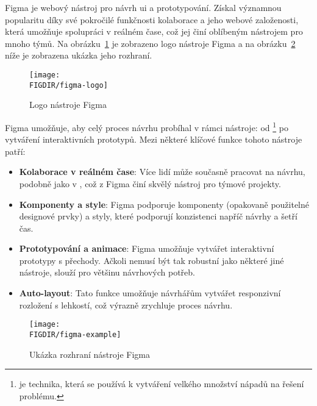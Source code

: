 \begin{subsection}{Figma}
    \label{subsec:navrh-ui-nastroje-figma}
     je webový nástroj pro návrh \ac{ui} a prototypování.
    Získal významnou popularitu díky své pokročilé funkčnosti kolaborace a jeho webové založenosti, která umožňuje spolupráci v reálném čase, což jej činí oblíbeným nástrojem pro mnoho týmů\cite{w_industry_the_ultimate_battle_figma_vs_sketch_vs_adobe_xd}.
    Na obrázku~\ref{fig:figma-logo} je zobrazeno logo nástroje Figma a na obrázku~\ref{fig:figma-example} níže je zobrazena ukázka jeho rozhraní.

    \begin{figure}[H]
        \centering
        \texttt{[image: \\FIGDIR/figma-logo]}
        \caption{Logo nástroje Figma\cite{figma}}
        \label{fig:figma-logo}
    \end{figure}

    Figma umožňuje, aby celý proces návrhu probíhal v rámci nástroje: od \footnote{ je technika, která se používá k vytváření velkého množství nápadů na řešení problému.} po vytváření interaktivních prototypů.
    Mezi některé klíčové funkce tohoto nástroje patří:

    \begin{itemize}
        \item \textbf{Kolaborace v reálném čase}: Více lidí může současně pracovat na návrhu, podobně jako v , což z Figma činí skvělý nástroj pro týmové projekty.
        \item \textbf{Komponenty a style}: Figma podporuje komponenty (opakovaně použitelné designové prvky) a styly, které podporují konzistenci napříč návrhy a šetří čas.
        \item \textbf{Prototypování a animace}: Figma umožňuje vytvářet interaktivní prototypy s přechody.
        Ačkoli nemusí být tak robustní jako některé jiné nástroje, slouží pro většinu návrhových potřeb.
        \item \textbf{Auto-layout}: Tato funkce umožňuje návrhářům vytvářet responzivní rozložení s lehkostí, což výrazně zrychluje proces návrhu.
    \end{itemize}

    \begin{figure}[H]
        \centering
        \texttt{[image: \\FIGDIR/figma-example]}
        \caption{Ukázka rozhraní nástroje Figma\cite{figma}}
        \label{fig:figma-example}
    \end{figure}


\end{subsection}
